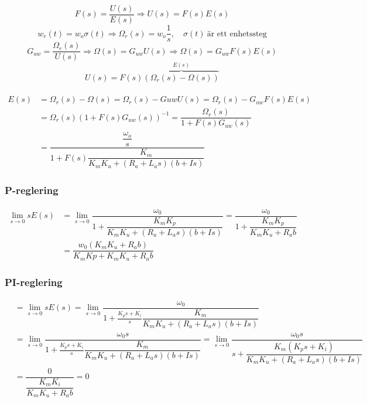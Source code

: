 \documentclass[11pt]{article}
\begin{document}
\begin{equation}
F(s)=\dfrac{U(s)}{E(s)} \Rightarrow U(s) = F(s)E(s)
\end{equation}
\begin{equation}
w_r(t)=w_o\sigma(t) \Rightarrow \Omega_r(s)=w_o\dfrac{1}{s}, \quad \sigma(t) \ \text{är ett enhetssteg}
\end{equation}
\begin{equation}
G_{uw} = \dfrac{\Omega_r(s)}{U(s)} \Rightarrow \Omega(s) = G_{uw}U(s) \Rightarrow \Omega(s) =G_{uw}F(s)E(s)
\end{equation}
\begin{equation}
U(s)=F(s)\overbrace{(\Omega_r(s)-\Omega(s))}^{E(s)}
\end{equation}\\[1em]
\begin{equation*}
\begin{split}
E(s)&= \Omega_r(s)-\Omega(s)=\Omega_r(s)-G{uw}U(s) = \Omega_r(s)-G_{uw}F(s)E(s)\\
&=\Omega_r(s)(1+F(s)G_{uw}(s))^{-1} = \dfrac{\Omega_r(s)}{1+F(s)G_{uw}(s)} \\ &=\dfrac{\dfrac{\omega_o}{s}}{1+F(s)\dfrac{K_m}{K_mK_u+(R_a+L_as)(b+Is)}}
\end{split}
\end{equation*}
\subsubsection{P-reglering}
\begin{equation*}
\begin{split}
\lim_{s \to 0}sE(s)&=\lim_{s \to 0}  \dfrac{\omega_0}{1+\dfrac{K_mK_p}{K_mK_u+(R_a+L_as)(b+Is)}} = \dfrac{\omega_0}{1+\dfrac{K_mK_p}{K_mK_u+R_ab}}\\[0.5em]
&=\dfrac{w_0(K_mK_u+R_ab)}{K_mKp+K_mK_u+R_ab}
\end{split}
\end{equation*} 
\subsubsection{PI-reglering}
\begin{equation*}
\begin{split}
&=\lim_{s \to 0}sE(s) = \lim_{s \to 0}  \dfrac{\omega_0}{1+\frac{K_ps+K_i}{s}\dfrac{K_m}{K_mK_u+(R_a+L_as)(b+Is)}}\\ &= \lim_{s \to 0}  \dfrac{\omega_0s}{1+\frac{K_ps+K_i}{s}\dfrac{K_m}{K_mK_u+(R_a+L_as)(b+Is)}} = \lim_{s \to 0} \dfrac{\omega_0s}{s+\dfrac{K_m(K_ps+K_i)}{K_mK_u+(R_a+L_as)(b+Is)}} \\
&=\dfrac{0}{\dfrac{K_mK_i}{K_mK_u+R_ab}} = 0
\end{split}
\end{equation*}
\end{document}
